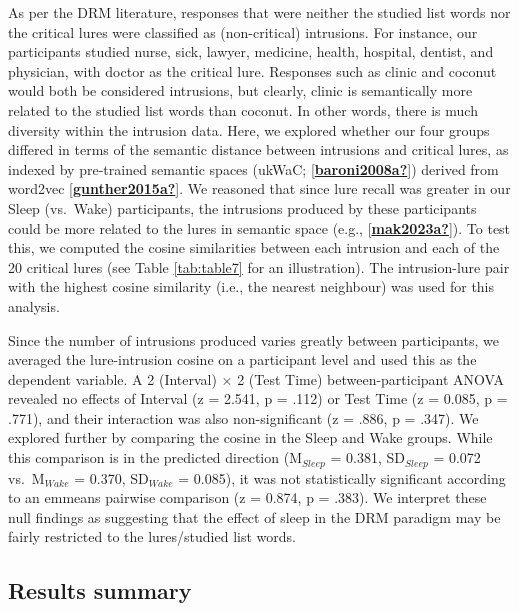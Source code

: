 \documentclass[
]{article}
\begin{document}
As per the DRM literature, responses that were neither the studied list words nor the critical lures were classified as (non-critical) intrusions. For instance, our participants studied nurse, sick, lawyer, medicine, health, hospital, dentist, and physician, with doctor as the critical lure. Responses such as clinic and coconut would both be considered intrusions, but clearly, clinic is semantically more related to the studied list words than coconut. In other words, there is much diversity within the intrusion data. Here, we explored whether our four groups differed in terms of the semantic distance between intrusions and critical lures, as indexed by pre-trained semantic spaces (ukWaC; {[}\protect\hyperlink{ref-baroni2008a}{\textbf{baroni2008a?}}{]}) derived from word2vec {[}\protect\hyperlink{ref-gunther2015a}{\textbf{gunther2015a?}}{]}. We reasoned that since lure recall was greater in our Sleep (vs.~Wake) participants, the intrusions produced by these participants could be more related to the lures in semantic space (e.g., {[}\protect\hyperlink{ref-mak2023a}{\textbf{mak2023a?}}{]}). To test this, we computed the cosine similarities between each intrusion and each of the 20 critical lures (see Table \ref{tab:table7} for an illustration). The intrusion-lure pair with the highest cosine similarity (i.e., the nearest neighbour) was used for this analysis.

Since the number of intrusions produced varies greatly between participants, we averaged the lure-intrusion cosine on a participant level and used this as the dependent variable. A 2 (Interval) \(\times\) 2 (Test Time) between-participant ANOVA revealed no effects of Interval (z = 2.541, p = .112) or Test Time (z = 0.085, p = .771), and their interaction was also non-significant (z = .886, p = .347). We explored further by comparing the cosine in the Sleep and Wake groups. While this comparison is in the predicted direction (M\(_{Sleep}\) = 0.381, SD\(_{Sleep}\) = 0.072 vs.~M\(_{Wake}\) = 0.370, SD\(_{Wake}\) = 0.085), it was not statistically significant according to an emmeans pairwise comparison (z = 0.874, p = .383). We interpret these null findings as suggesting that the effect of sleep in the DRM paradigm may be fairly restricted to the lures/studied list words.

\hypertarget{results-summary}{%
\subsection{Results summary}\label{results-summary}}
\end{document}
